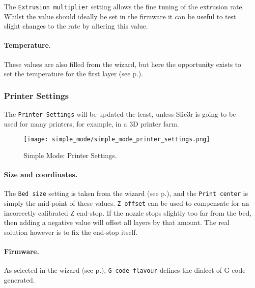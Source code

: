The \texttt{Extrusion multiplier} setting allows the fine tuning of the extrusion rate.  Whilst the value should ideally be set in the firmware it can be useful to test slight changes to the rate by altering this value.

\paragraph{Temperature.} %
\label{par:temperature}
These values are also filled from the wizard, but here the opportunity exists to set the temperature for the first layer (see p.\pageref{sec:the_important_first_layer}).


\subsubsection{Printer Settings}

The \texttt{Printer Settings} will be updated the least, unless Slic3r is going to be used for many printers, for example, in a 3D printer farm.

\begin{figure}[H]
\centering
\texttt{[image: simple\_mode/simple\_mode\_printer\_settings.png]}
\caption{Simple Mode: Printer Settings.}
\label{fig:simple_mode_printer_settings}
\end{figure}

\paragraph{Size and coordinates.} %
\label{par:size_and_coordinates}
The \texttt{Bed size} setting is taken from the wizard (see p.\pageref{sub:2_bed_size}), and the \texttt{Print center} is simply the mid-point of these values.  \texttt{Z offset} can be used to compensate for an incorrectly calibrated Z end-stop.  If the nozzle stops slightly too far from the bed, then adding a negative value will offset all layers by that amount.  The real solution however is to fix the end-stop itself.

\paragraph{Firmware.} %
\label{par:firmware}
As selected in the wizard (see p.\pageref{sub:1_firmware_type}), \texttt{G-code flavour} defines the dialect of G-code generated.


